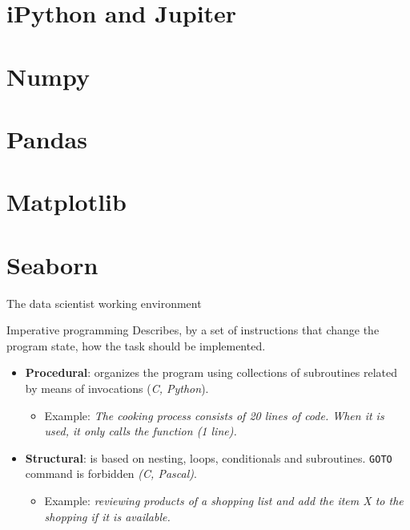 \documentclass[10pt,compress]{beamer} %
\begin{document}
\section{iPython and Jupiter}
\section{Numpy}
\section{Pandas}
\section{Matplotlib}
\section{Seaborn}

\begin{frame}{The data scientist working environment}
	\begin{block}{Imperative programming}
		Describes, by a set of instructions that change the \alert{program state}, \alert{how} the task should be implemented.  
  	\end{block}
  	\begin{itemize}
  		\item \textbf{Procedural}: organizes the program using collections of subroutines related by means of invocations (\textit{C, Python}).
  		\begin{itemize}
  			\item Example: \textit{The cooking process consists of 20 lines of code. When it is used, it only calls the function (1 line).} 
  		\end{itemize}
  		\item \textbf{Structural}: is based on nesting, loops, conditionals and subroutines. \texttt{GOTO} command is forbidden 				 \textit{(C, Pascal)}.
  		\begin{itemize}
  			\item Example: \textit{reviewing products of a shopping list and add the item X to the shopping if it is available.} 
  		\end{itemize}
  	\end{itemize}
\end{frame}
\end{document}
